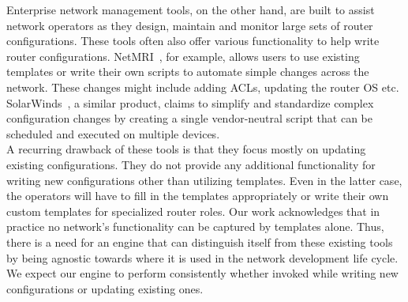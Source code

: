 Enterprise network management tools, on the other hand, are built to assist network operators as they design, maintain and monitor large sets of router configurations. These tools often also offer various functionality to help write router configurations. NetMRI~\cite{netmri}, for example, allows users to use existing templates or write their own scripts to automate simple changes across the network. These changes might include adding ACLs, updating the router OS etc. SolarWinds~\cite{solarwinds}, a similar product, claims to simplify and standardize complex configuration changes by creating a single vendor-neutral script that can be scheduled and executed on multiple devices.\\

A recurring drawback of these tools is that they focus mostly on updating existing configurations. They do not provide any additional functionality for writing new configurations other than utilizing templates. Even in the latter case, the operators will have to fill in the templates appropriately or write their own custom templates for specialized router roles. Our work acknowledges that in practice no network’s functionality can be captured by templates alone. Thus, there is a need for an engine that can distinguish itself from these existing tools by being agnostic towards where it is used in the network development life cycle. We expect our engine to perform consistently whether invoked while writing new configurations or updating existing ones.
